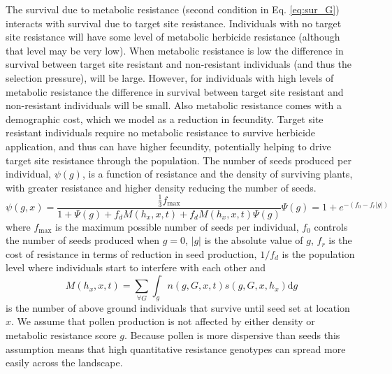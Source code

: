 \documentclass[10pt,letterpaper]{article}
\begin{document}
The survival due to metabolic resistance (second condition in Eq. \ref{eq:sur_G}) interacts with survival due to target site resistance. Individuals with no target site resistance will have some level of metabolic herbicide resistance (although that level may be very low). When metabolic resistance is low the difference in survival between target site resistant and non-resistant individuals (and thus the selection pressure), will be large. However, for individuals with high levels of metabolic resistance the difference in survival between target site resistant and non-resistant individuals will be small. Also metabolic resistance comes with a demographic cost, which we model as a reduction in fecundity. Target site resistant individuals require no metabolic resistance to survive herbicide application, and thus can have higher fecundity, potentially helping to drive target site resistance through the population. The number of seeds produced per individual, $\psi(g)$, is a function of resistance and the density of surviving plants, with greater resistance and higher density reducing the number of seeds. 
\begin{subequations}
\begin{equation}\label{eq:seed_production}
	\psi(g, x) = \frac{\frac{1}{3}f_\text{max}}{1 + \Psi(g) + f_d M(h_x, x, t) + f_dM(h_x, x, t) \Psi(g)}
\end{equation}  
\begin{equation}
	\Psi(g) = 1 + e^{-(f_0 - f_r|g|)}
\end{equation}
\end{subequations}
where $f_\text{max}$ is the maximum possible number of seeds per individual, $f_0$ controls the number of seeds produced when $g = 0$, $|g|$ is the absolute value of $g$, $f_r$ is the cost of resistance in terms of reduction in seed production, $1/f_d$ is the population level where individuals start to interfere with each other and 
\begin{equation}\label{eq:num_sur}
   M(h_x, x, t) = \sum_{\forall G} \int_g n(g, G, x, t)s(g, G, x, h_x)\text{d}g
\end{equation}
is the number of above ground individuals that survive until seed set at location $x$. We assume that pollen production is not affected by either density or metabolic resistance score $g$. Because pollen is more dispersive than seeds this assumption means that high quantitative resistance genotypes can spread more easily across the landscape.   
\end{document}
